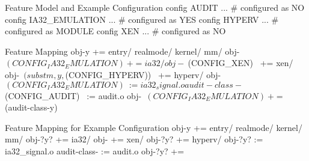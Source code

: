 \begin{frame}[fragile]{\myframetitle}
	\begin{mycolumns}

		\begin{kconfigtight}[basicstyle=\footnotesize]{Feature Model and Example Configuration}
			config AUDIT ... # configured as NO
			config IA32_EMULATION ... # configured as YES
			config HYPERV ... # configured as MODULE
			config XEN ... # configured as NO
\end{kconfigtight}
	\mynextcolumn
		\begin{kbuildtight}[basicstyle=\small]{Feature Mapping}
obj-y += entry/ realmode/ kernel/ mm/
obj-~$(CONFIG_IA32_EMULATION)~ += ia32/
obj-~$(CONFIG_XEN)~ += xen/
obj-~$(subst m,y,$(CONFIG_HYPERV))~ += hyperv/
obj-~$(CONFIG_IA32_EMULATION)~ := ia32_signal.o
audit-class-~$(CONFIG_AUDIT)~ := audit.o
obj-~$(CONFIG_IA32_EMULATION)~ += ~$(audit-class-y)~
		\end{kbuildtight}

		\begin{kbuildtight}[basicstyle=\small]{Feature Mapping for Example Configuration}
obj-y += entry/ realmode/ kernel/ mm/
obj-?y? += ia32/
obj- += xen/
obj-?y? += hyperv/
obj-?y? := ia32_signal.o
audit-class- := audit.o
obj-?y? +=
		\end{kbuildtight}

	\end{mycolumns}
\end{frame}

